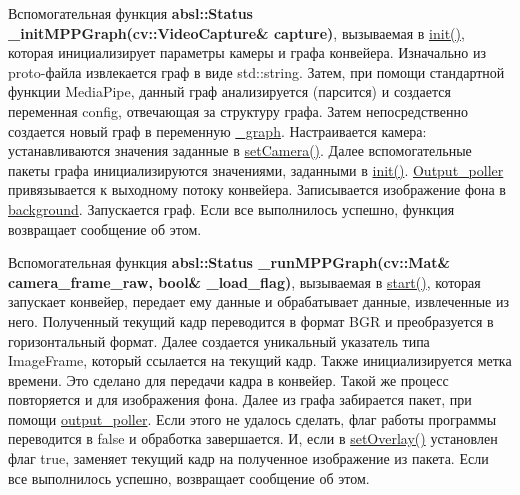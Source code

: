 \documentclass[a4paper,14pt]{extreport}
\begin{document}
        Вспомогательная функция \textbf{absl::Status \_initMPPGraph(cv::VideoCapture\& capture)}, вызываемая в \hyperlink{init}{init()}, которая инициализирует параметры камеры и графа конвейера. Изначально из proto-файла извлекается граф в виде std::string. Затем, при помощи стандартной функции MediaPipe, данный граф анализируется (парсится) и создается переменная config, отвечающая за структуру графа. Затем непосредственно создается новый граф в переменную \hyperlink{graph}{\_graph}. Настраивается камера: устанавливаются значения заданные в \hyperlink{camera}{setCamera()}. Далее вспомогательные пакеты графа инициализируются значениями, заданными в \hyperlink{init}{init()}. \hyperlink{poller}{Output\_poller} привязывается к выходному потоку конвейера. Записывается изображение фона в \hyperlink{back}{background}. Запускается граф. Если все выполнилось успешно, функция возвращает сообщение об этом.
        
        
        Вспомогательная функция \textbf{absl::Status \_runMPPGraph(cv::Mat\& camera\_frame\_raw, bool\& \_load\_flag)}, вызываемая в \hyperlink{start}{start()}, которая запускает конвейер, передает ему данные и обрабатывает данные, извлеченные из него. Полученный текущий кадр переводится в формат BGR и преобразуется в горизонтальный формат. Далее создается уникальный указатель типа ImageFrame, который ссылается на текущий кадр. Также инициализируется метка времени. Это сделано для передачи кадра в конвейер. Такой же процесс повторяется и для изображения фона. Далее из графа забирается пакет, при помощи \hyperlink{poller}{output\_poller}. Если этого не удалось сделать, флаг работы программы переводится в false и обработка завершается. И, если в \hyperlink{overlay}{setOverlay()} установлен флаг true, заменяет текущий кадр на полученное изображение из пакета. Если все выполнилось успешно, возвращает сообщение об этом.
        
\end{document}
